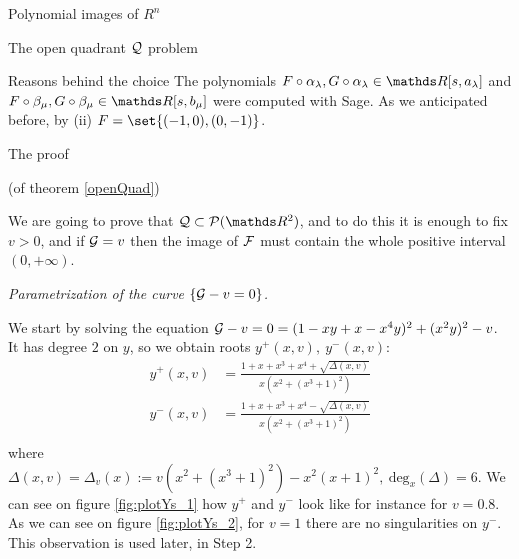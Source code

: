 \documentclass[11pt, a4paper, english, twoside, notitlepage]{report}
\begin{document}
\begin{chapter}{Polynomial images of $R^n$}
\begin{section}{The open quadrant $\mathcal{Q}$ problem}
\begin{subsection}{Reasons behind the choice}
		The polynomials $F\circ\alpha_{\lambda }, G\circ\alpha_{\lambda} \in \R[s,a_{\lambda}]$ and $F\circ\beta_{\mu},G\circ\beta_{\mu} \in\R[s,b_{\mu}]$ were computed with Sage. As we anticipated before, by (ii) $F = \set{(-1, 0), (0, -1)}$.
		
	\end{subsection}
	
	\begin{subsection}{The proof}
		
		\begin{Proof}(of theorem \ref{openQuad})
			
			We are going to prove that $\Qu \subset \P(\R^2)$, and to do this it is enough to fix $v > 0$, and if $\mathcal{G} = v$ then the image of $\mathcal{F}$ must contain the whole positive interval $(0, +\infty)$.
			\begin{center}
				 \emph{Parametrization of the curve $\{\mathcal{G}-v=0\}$.}
			\end{center}

			We start by solving the equation $\mathcal{G}-v= 0 = (1 - xy + x - x^4 y)^2 + (x^2 y)^2 - v$. It has degree $2$ on $y$, so we obtain roots $y^+(x,v),\ y^-(x,v)$:
			\begin{equation*}
				\begin{aligned}
				y^+(x,v) & =\frac{1 + x + x^3 + x^4 + \sqrt{\Delta(x,v)}}{x(x^2 + (x^3 + 1)^2)}\\
				y^-(x,v) & =\frac{1 + x + x^3 + x^4 - \sqrt{\Delta(x,v)}}{x(x^2 + (x^3 + 1)^2)}\\
				\end{aligned}
			\end{equation*}
			where $\Delta(x,v) = \Delta_v(x):=v(x^2+(x^3+1)^2)-x^2(x+1)^2,\ \text{deg}_x(\Delta) = 6$. We can see on figure \ref{fig:plotYs_1} how $y^+$ and $y^-$ look like for instance for $v = 0.8$. As we can see on figure \ref{fig:plotYs_2}, for $v = 1$ there are no singularities on $y^-$. This observation is used later, in Step 2.
			

\end{Proof}
\end{subsection}
\end{section}
\end{chapter}
\end{document}
